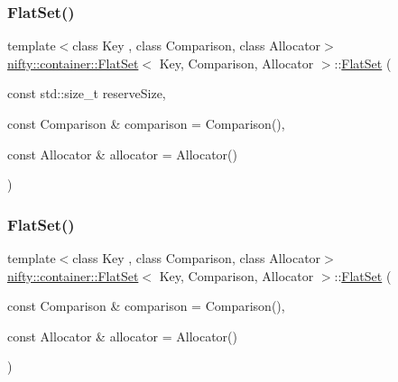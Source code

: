 \subsubsection{\texorpdfstring{Flat\+Set()}{FlatSet()}\hspace{0.1cm}{\footnotesize\ttfamily [1/3]}}
{\footnotesize\ttfamily template$<$class Key , class Comparison, class Allocator$>$ \\
\hyperlink{classnifty_1_1container_1_1FlatSet}{nifty\+::container\+::\+Flat\+Set}$<$ Key, Comparison, Allocator $>$\+::\hyperlink{classnifty_1_1container_1_1FlatSet}{Flat\+Set} (\begin{DoxyParamCaption}\item[{const std\+::size\+\_\+t}]{reserve\+Size,  }\item[{const Comparison \&}]{comparison = {\ttfamily Comparison()},  }\item[{const Allocator \&}]{allocator = {\ttfamily Allocator()} }\end{DoxyParamCaption})\hspace{0.3cm}{\ttfamily [inline]}}

\mbox{\label{classnifty_1_1container_1_1FlatSet_a1f36a0b023633f58bf90e0660f0bc16c}} 
\subsubsection{\texorpdfstring{Flat\+Set()}{FlatSet()}\hspace{0.1cm}{\footnotesize\ttfamily [2/3]}}
{\footnotesize\ttfamily template$<$class Key , class Comparison, class Allocator$>$ \\
\hyperlink{classnifty_1_1container_1_1FlatSet}{nifty\+::container\+::\+Flat\+Set}$<$ Key, Comparison, Allocator $>$\+::\hyperlink{classnifty_1_1container_1_1FlatSet}{Flat\+Set} (\begin{DoxyParamCaption}\item[{const Comparison \&}]{comparison = {\ttfamily Comparison()},  }\item[{const Allocator \&}]{allocator = {\ttfamily Allocator()} }\end{DoxyParamCaption})\hspace{0.3cm}{\ttfamily [inline]}}

\mbox{\label{classnifty_1_1container_1_1FlatSet_a4ac0179c196a52ca4cbe2c82b5b7e4fa}} 
